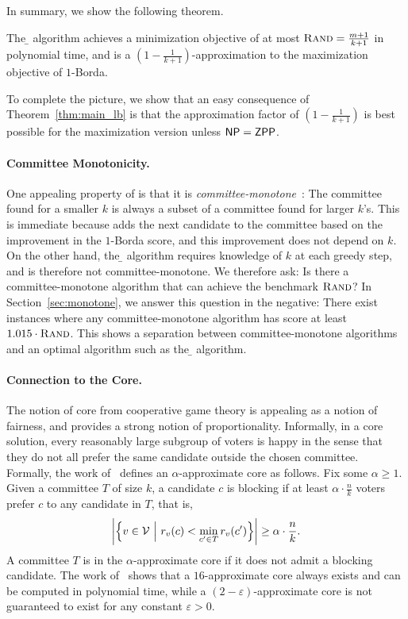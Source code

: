 In summary, we show the following theorem. 
\begin{theorem}
\label{thm:main_banzhaf}
The \b{} algorithm achieves a minimization objective of at most ${\normalfont\textsc{Rand}} = \frac{m+1}{k+1}$ in polynomial time, and is a $\left(1 - \frac{1}{k+1}\right)$-approximation to the maximization objective of $1$-Borda.
\end{theorem}
To complete the picture, we show that an easy consequence of Theorem~\ref{thm:main_lb} is that the approximation factor of $\left(1 - \frac{1}{k+1}\right)$ is best possible for the maximization version unless $\mathsf{NP} = \mathsf{ZPP}$.

\paragraph{Committee Monotonicity.} One appealing property of \g{} is that it is \emph{committee-monotone}~\cite{Elkind17}: The committee found for a smaller $k$ is always a subset of a committee found for larger $k$'s. This is immediate because \g{} adds the next candidate to the committee based on the improvement in the $1$-Borda score, and this improvement does not depend on $k$. On the other hand, the \b{} algorithm requires knowledge of $k$ at each greedy step, and is therefore not committee-monotone. We therefore ask: Is there a committee-monotone algorithm that can achieve the benchmark ${\normalfont\textsc{Rand}}$? In Section~\ref{sec:monotone}, we answer this question in the negative: There exist instances where any committee-monotone algorithm has score at least $1.015 \cdot {\normalfont\textsc{Rand}}$. This shows a separation between committee-monotone algorithms and an optimal algorithm such as the \b{} algorithm.

\paragraph{Connection to the Core.} The notion of core from cooperative game theory is appealing as a notion of fairness, and provides a strong notion of proportionality. Informally, in a core solution, every reasonably large subgroup of voters is happy in the sense that they do not all prefer the same candidate outside the chosen committee. Formally, the work of~\cite{JiangMW20,ChengJMW20} defines an $\alpha$-approximate core as follows. Fix some $\alpha \ge 1$. Given a committee $T$ of size $k$, a candidate $c$ is blocking if at least $\alpha \cdot \frac{n}{k}$ voters prefer $c$ to any candidate in $T$, that is,
\begin{equation}
    \label{eq:core}
\left| \Big\{v \in \mathcal{V} \ \Big| \ r_v(c) < \min_{c' \in T} r_v(c') \Big\} \right| \ge \alpha \cdot \frac{n}{k}.
\end{equation}
A committee $T$ is in the $\alpha$-approximate core if it does not admit  a blocking candidate. The work of~\cite{ChengJMW20,JiangMW20} shows that a $16$-approximate core always exists and can be computed in polynomial time, while a $(2-\varepsilon)$-approximate core is not guaranteed to exist for any constant $\varepsilon > 0$.

